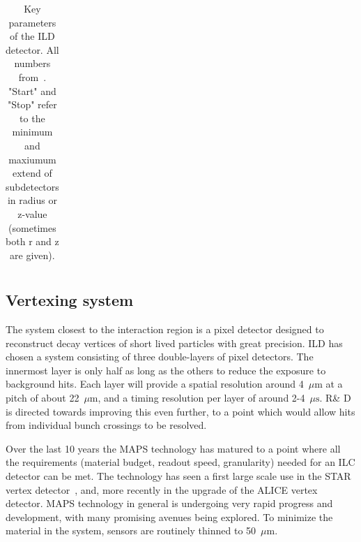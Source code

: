 \documentclass[%
 amsmath,amssymb,
 aps,
 longbibliography,
]{revtex4-1}
\newcommand{\bottomrule}{\hline}
\begin{document}
\begin{table}[th]
\begin{tabular}{|l|l|c|c|p{4cm}|}
        
\bottomrule
    \end{tabular}
    \caption{Key parameters of the ILD detector. All numbers from~\cite{Behnke:2013lya}. "Start" and "Stop" refer to the minimum and maxiumum extend of subdetectors in radius or z-value (sometimes both r and z are given).}
    \label{ild:tab:barrelpara}
\end{table}


\subsection{Vertexing system}
The system closest to the interaction region is a pixel detector designed to reconstruct decay vertices of short lived particles with great precision. ILD has chosen a system consisting of three double-layers of pixel detectors. The innermost layer is only half as long as the others to reduce the exposure to background hits. Each layer will provide a spatial resolution around 4~$\mu\mathrm{m}$ at a pitch of about 22~$\mu\mathrm{m}$, and a timing resolution per layer of around 2-4~$\mu\mathrm{s}$. R\& D is directed towards improving this even further, to a point which would allow hits from individual bunch crossings to be resolved.

Over the last 10 years the MAPS technology has matured to a point where all the requirements (material budget, readout speed, granularity) needed for an ILC detector can be met. The technology has seen a first large scale use in the STAR vertex detector~\cite{ild:bib:VTXcps3}, and, more recently in the upgrade of the ALICE vertex detector. 
MAPS technology in general is undergoing very rapid progress and development, with many promising avenues being explored. To minimize the material in the system, sensors are routinely thinned to 50~$\mu{\mathrm m}$. 
\end{document}
